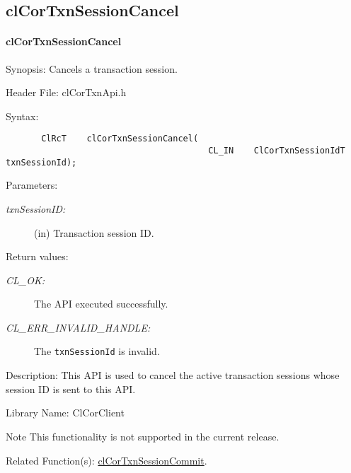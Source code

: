 \begin{flushleft}
\subsection{clCorTxnSessionCancel}
\hypertarget{pagecor141}{}\paragraph{cl\-Cor\-Txn\-Session\-Cancel}\label{pagecor141}
\begin{Desc}
\item[Synopsis:]Cancels a transaction session.\end{Desc}
\begin{Desc}
\item[Header File:]clCorTxnApi.h\end{Desc}
\begin{Desc}
\item[Syntax:]

\footnotesize\begin{verbatim}       ClRcT    clCorTxnSessionCancel(
                            			CL_IN    ClCorTxnSessionIdT  txnSessionId);
\end{verbatim}
\normalsize
\end{Desc}
\begin{Desc}
\item[Parameters:]
\begin{description}
\item[{\em txn\-Session\-ID:}](in) Transaction session ID.\end{description}
\end{Desc}
\begin{Desc}
\item[Return values:]
\begin{description}
\item[{\em CL\_\-OK:}]The API executed successfully.
\item[{\em CL\_\-ERR\_\-INVALID\_\-HANDLE:}] The {\tt{txnSessionId}} is invalid.
\end{description}
\end{Desc}
\begin{Desc}
\item[Description:]This API is used to cancel the active transaction sessions whose session ID is sent to this API.\end{Desc}
\begin{Desc}
\item[Library Name:]Cl\-Cor\-Client\end{Desc}
\begin{Desc}
\item[Note]
This functionality is not supported in the current release.
\end{Desc}
\begin{Desc}
\item[Related Function(s):]\hyperlink{pagecor140}{cl\-Cor\-Txn\-Session\-Commit}. \end{Desc}
\newpage







\end{flushleft}
